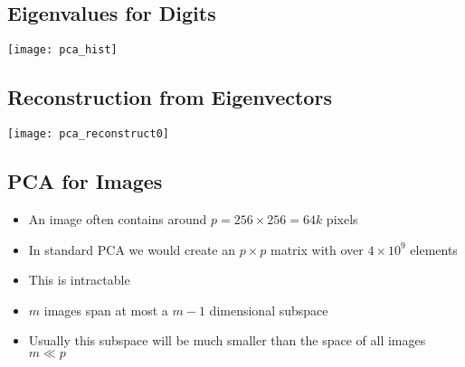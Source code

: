
\begin{slide}
\section[-2]{Eigenvalues for Digits}

\begin{center}
  \texttt{[image: pca\_hist]}
\end{center}
\end{slide}




\begin{slide}
\section{Reconstruction from Eigenvectors}

\pause
\pb
\begin{center}
  \texttt{[image: pca\_reconstruct0]}
\end{center}
\end{slide}

\Outline %

\begin{slide}
\section{PCA for Images}

\begin{PauseHighLight}


\begin{itemize}
\item An image often contains around $p=256\times256 = 64k$ pixels\pause
\item In standard PCA we would create an $p\times p$ matrix with over
  $4\times 10^9$ elements\pause
\item This is intractable\pause
\item $m$ images span at most a $m-1$ dimensional subspace\pause
\item Usually this subspace will be much smaller than the space of all
  images $m\ll p$\pause
\end{itemize}

\end{PauseHighLight}

\end{slide}

